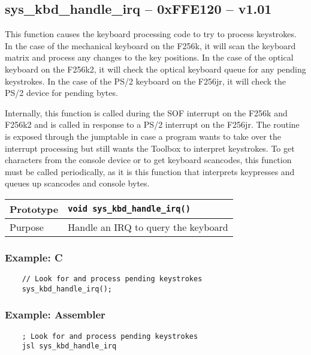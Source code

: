 \subsection*{sys\_kbd\_handle\_irq -- 0xFFE120 -- v1.01}
This function causes the keyboard processing code to try to process keystrokes.
In the case of the mechanical keyboard on the F256k, it will scan the keyboard matrix and process any changes to the key positions.
In the case of the optical keyboard on the F256k2, it will check the optical keyboard queue for any pending keystrokes.
In the case of the PS/2 keyboard on the F256jr, it will check the PS/2 device for pending bytes.

Internally, this function is called during the SOF interrupt on the F256k and F256k2 and is called in response to a PS/2 interrupt on the F256jr. The routine is exposed through the jumptable in case a program wants to take over the interrupt processing but still wants the Toolbox to interpret keystrokes. To get characters from the console device or to get keyboard scancodes, this function must be called periodically, as it is this function that interprets keypresses and queues up scancodes and console bytes.

\bigskip

\begin{table}[!h]\begin{tabular}{|l||l|} \hline
Prototype & \lstinline!void sys_kbd_handle_irq()! \\ \hline
Purpose & Handle an IRQ to query the keyboard \\ \hline
\end{tabular}\end{table}

\subsubsection*{Example: C}
\begin{lstlisting}
	// Look for and process pending keystrokes
	sys_kbd_handle_irq();
\end{lstlisting}

\subsubsection*{Example: Assembler}
\begin{verbatim}
	; Look for and process pending keystrokes
	jsl sys_kbd_handle_irq
\end{verbatim}